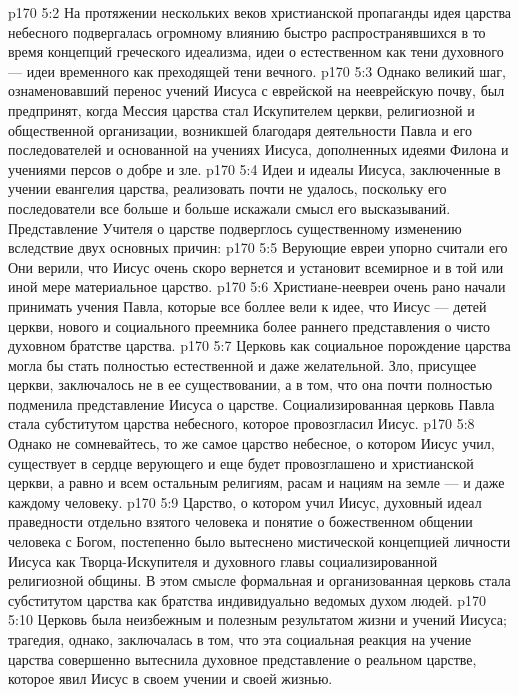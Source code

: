\vs p170 5:2 На протяжении нескольких веков христианской пропаганды идея царства небесного подвергалась огромному влиянию быстро распространявшихся в то время концепций греческого идеализма, идеи о естественном как тени духовного --- идеи временного как преходящей тени вечного.
\vs p170 5:3 Однако великий шаг, ознаменовавший перенос учений Иисуса с еврейской на нееврейскую почву, был предпринят, когда Мессия царства стал Искупителем церкви, религиозной и общественной организации, возникшей благодаря деятельности Павла и его последователей и основанной на учениях Иисуса, дополненных идеями Филона и учениями персов о добре и зле.
\vs p170 5:4 Идеи и идеалы Иисуса, заключенные в учении евангелия царства, реализовать почти не удалось, поскольку его последователи все больше и больше искажали смысл его высказываний. Представление Учителя о царстве подверглось существенному изменению вследствие двух основных причин:
\vs p170 5:5 \bibnobreakspace Верующие евреи упорно считали его  Они верили, что Иисус очень скоро вернется и установит всемирное и в той или иной мере материальное царство.
\vs p170 5:6 \pc {}\bibnobreakspace Христиане\hyp{}неевреи очень рано начали принимать учения Павла, которые все боллее вели к идее, что Иисус ---  детей церкви, нового и социального преемника более раннего представления о чисто духовном братстве царства.
\vs p170 5:7 \pc Церковь как социальное порождение царства могла бы стать полностью естественной и даже желательной. Зло, присущее церкви, заключалось не в ее существовании, а в том, что она почти полностью подменила представление Иисуса о царстве. Социализированная церковь Павла стала субститутом царства небесного, которое провозгласил Иисус.
\vs p170 5:8 Однако не сомневайтесь, то же самое царство небесное, о котором Иисус учил, существует в сердце верующего и еще будет провозглашено и христианской церкви, а равно и всем остальным религиям, расам и нациям на земле --- и даже каждому человеку.
\vs p170 5:9 Царство, о котором учил Иисус, духовный идеал праведности отдельно взятого человека и понятие о божественном общении человека с Богом, постепенно было вытеснено мистической концепцией личности Иисуса как Творца\hyp{}Искупителя и духовного главы социализированной религиозной общины. В этом смысле формальная и организованная церковь стала субститутом царства как братства индивидуально ведомых духом людей.
\vs p170 5:10 Церковь была неизбежным и полезным  результатом жизни и учений Иисуса; трагедия, однако, заключалась в том, что эта социальная реакция на учение царства совершенно вытеснила духовное представление о реальном царстве, которое явил Иисус в своем учении и своей жизнью.
